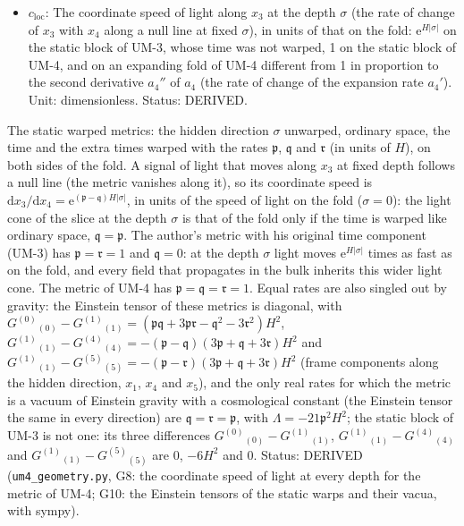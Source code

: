\documentclass[
  10pt,
]{article}
\begin{document}
\begin{itemize}
  \(\vec x_5\): The position along the extra times,
  \(\vec x_5 = (x_5, x_6, x_7)\);
  \(\mathrm{d}\vec x_5^2 = \mathrm{d}x_5^2 + \mathrm{d}x_6^2 + \mathrm{d}x_7^2\).
  Unit: length. Status: AUTHOR.
\item
  \(c_{\mathrm{loc}}\): The coordinate speed of light along \(x_3\) at
  the depth \(\sigma\) (the rate of change of \(x_3\) with \(x_4\) along
  a null line at fixed \(\sigma\)), in units of that on the fold:
  \(\mathrm{e}^{H\lvert\sigma\rvert}\) on the static block of UM-3,
  whose time was not warped, 1 on the static block of UM-4, and on an
  expanding fold of UM-4 different from 1 in proportion to the second
  derivative \(a_4''\) of \(a_4\) (the rate of change of the expansion
  rate \(a_4'\)). Unit: dimensionless. Status: DERIVED.
\end{itemize}

The static warped metrics: the hidden direction \(\sigma\) unwarped,
ordinary space, the time and the extra times warped with the rates
\(\mathfrak{p}\), \(\mathfrak{q}\) and \(\mathfrak{r}\) (in units of
\(H\)), on both sides of the fold. A signal of light that moves along
\(x_3\) at fixed depth follows a null line (the metric vanishes along
it), so its coordinate speed is
\(\mathrm{d}x_3/\mathrm{d}x_4 = \mathrm{e}^{(\mathfrak{p} - \mathfrak{q})H\lvert\sigma\rvert}\),
in units of the speed of light on the fold (\(\sigma = 0\)): the light
cone of the slice at the depth \(\sigma\) is that of the fold only if
the time is warped like ordinary space, \(\mathfrak{q} = \mathfrak{p}\).
The author's metric with his original time component (UM-3) has
\(\mathfrak{p} = \mathfrak{r} = 1\) and \(\mathfrak{q} = 0\): at the
depth \(\sigma\) light moves \(\mathrm{e}^{H\lvert\sigma\rvert}\) times
as fast as on the fold, and every field that propagates in the bulk
inherits this wider light cone. The metric of UM-4 has
\(\mathfrak{p} = \mathfrak{q} = \mathfrak{r} = 1\). Equal rates are also
singled out by gravity: the Einstein tensor of these metrics is
diagonal, with
\(G^{(0)}{}_{(0)} - G^{(1)}{}_{(1)} = (\mathfrak{p}\mathfrak{q} + 3\mathfrak{p}\mathfrak{r} - \mathfrak{q}^2 - 3\mathfrak{r}^2)H^2\),
\(G^{(1)}{}_{(1)} - G^{(4)}{}_{(4)} = -(\mathfrak{p} - \mathfrak{q})(3\mathfrak{p} + \mathfrak{q} + 3\mathfrak{r})H^2\)
and
\(G^{(1)}{}_{(1)} - G^{(5)}{}_{(5)} = -(\mathfrak{p} - \mathfrak{r})(3\mathfrak{p} + \mathfrak{q} + 3\mathfrak{r})H^2\)
(frame components along the hidden direction, \(x_1\), \(x_4\) and
\(x_5\)), and the only real rates for which the metric is a vacuum of
Einstein gravity with a cosmological constant (the Einstein tensor the
same in every direction) are
\(\mathfrak{q} = \mathfrak{r} = \mathfrak{p}\), with
\(\Lambda = -21\mathfrak{p}^2H^2\); the static block of UM-3 is not one:
its three differences \(G^{(0)}{}_{(0)} - G^{(1)}{}_{(1)}\),
\(G^{(1)}{}_{(1)} - G^{(4)}{}_{(4)}\) and
\(G^{(1)}{}_{(1)} - G^{(5)}{}_{(5)}\) are \(0\), \(-6H^2\) and \(0\).
Status: DERIVED (\texttt{um4\_geometry.py}, G8: the coordinate speed of
light at every depth for the metric of UM-4; G10: the Einstein tensors
of the static warps and their vacua, with sympy).
\end{document}
